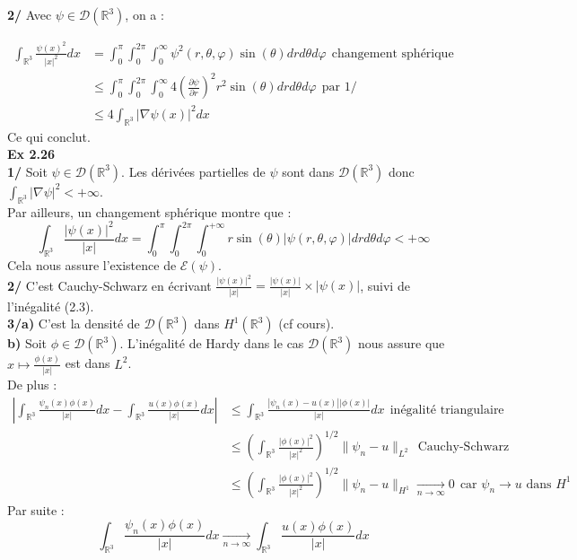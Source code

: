 \documentclass[a4paper,12pt]{article}
\begin{document}
\textbf{2/} Avec $\psi \in \mathcal{D}( \mathbb{R}^3)$, on a :

\begin{align*}
\int_{\mathbb{R}^3} \frac{\psi(x)^2}{|x|^2} dx & = \int_0^{\pi} \int_0^{2 \pi} \int_{0}^{\infty} \psi^2(r, \theta, \varphi) \sin (\theta) dr d \theta d \varphi \ \ \text{changement sphérique} \\
& \leq \int_0^{\pi} \int_0^{2 \pi} \int_{0}^{\infty} 4 \left( \frac{\partial \psi}{\partial r}\right)^2 r^2 \sin (\theta) dr d \theta d \varphi \ \ \text{par 1/} \\
& \boxed{\leq 4 \int_{\mathbb{R}^3} |\nabla \psi(x)|^2 dx}
\end{align*}
Ce qui conclut. \\

\textbf{Ex 2.26} \\
\textbf{1/} Soit $\psi \in \mathcal{D}(\mathbb{R}^3)$. Les dérivées partielles de $\psi$ sont dans $\mathcal{D}(\mathbb{R}^3)$ donc $\int_{\mathbb{R}^3} |\nabla \psi|^2 < + \infty$. \\

Par ailleurs, un changement sphérique montre que :
$$\int_{\mathbb{R}^3} \frac{|\psi(x)|^2}{|x|} dx = \int_{0}^{\pi} \int_{0}^{2 \pi} \int_{0}^{+ \infty} r \sin (\theta) |\psi(r, \theta, \varphi)| dr d \theta d \varphi < + \infty $$
Cela nous assure l'existence de $\mathcal{E}(\psi)$.  \\

\textbf{2/} C'est Cauchy-Schwarz en écrivant $\frac{|\psi (x)|^2}{|x|} = \frac{|\psi (x)|}{|x|} \times |\psi (x)|$, suivi de l'inégalité (2.3). \\

\textbf{3/a)} C'est la densité de $\mathcal{D}(\mathbb{R}^3)$ dans $H^1(\mathbb{R}^3)$ (cf cours). \\

\textbf{b)} Soit $\phi \in \mathcal{D}(\mathbb{R}^3)$. L'inégalité de Hardy dans le cas $\mathcal{D}(\mathbb{R}^3)$ nous assure que $x \mapsto \frac{\phi(x)}{|x|}$ est dans $L^2$. \\

De plus :
\begin{align*}
\left| \int_{\mathbb{R}^3} \frac{\psi_n(x) \phi(x)}{|x|} dx - \int_{\mathbb{R}^3} \frac{u(x) \phi(x)}{|x|} dx \right| & \leq \int_{\mathbb{R}^3} \frac{|\psi_n(x) - u(x)||\phi(x)|}{|x|} dx \ \ \text{inégalité triangulaire} \\
& \leq \left( \int_{\mathbb{R}^3} \frac{|\phi(x)|^2}{|x|^2} \right)^{1/2} \|\psi_n - u  \|_{L^2} \ \ \text{Cauchy-Schwarz} \\
& \leq \left( \int_{\mathbb{R}^3} \frac{|\phi(x)|^2}{|x|^2} \right)^{1/2} \|\psi_n - u  \|_{H^1} \underset{n \to \infty}{\longrightarrow} 0 \ \ \text{car } \psi_n \rightarrow u \text{ dans } H^1
\end{align*}
Par suite :
$$\boxed{\int_{\mathbb{R}^3} \frac{\psi_n(x) \phi(x)}{|x|} dx \underset{n \to \infty}{\longrightarrow} \int_{\mathbb{R}^3} \frac{u(x) \phi(x)}{|x|} dx}$$  \\
\end{document}
